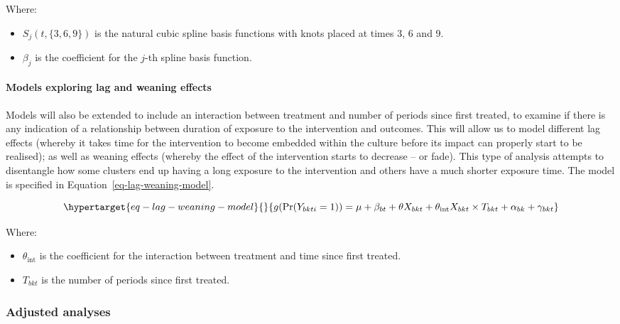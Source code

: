 \documentclass[
]{scrartcl}
\let\oldparagraph\paragraph
\renewcommand{\paragraph}[1]{\oldparagraph{#1}\mbox{}}
\providecommand{\tightlist}{%
  \setlength{\itemsep}{0pt}\setlength{\parskip}{0pt}}\usepackage{longtable,booktabs,array}
\begin{document}
Where:

\begin{itemize}
\tightlist
\item
  \(S_j(t, \{3, 6, 9\})\) is the natural cubic spline basis functions
  with knots placed at times 3, 6 and 9.
\item
  \(\beta_j\) is the coefficient for the \(j\)-th spline basis function.
\end{itemize}

\hypertarget{models-exploring-lag-and-weaning-effects}{%
\paragraph{Models exploring lag and weaning
effects}\label{models-exploring-lag-and-weaning-effects}}

Models will also be extended to include an interaction between treatment
and number of periods since first treated, to examine if there is any
indication of a relationship between duration of exposure to the
intervention and outcomes. This will allow us to model different lag
effects (whereby it takes time for the intervention to become embedded
within the culture before its impact can properly start to be realised);
as well as weaning effects (whereby the effect of the intervention
starts to decrease -- or fade). This type of analysis attempts to
disentangle how some clusters end up having a long exposure to the
intervention and others have a much shorter exposure time. The model is
specified in Equation~\ref{eq-lag-weaning-model}.

\begin{equation}\protect\hypertarget{eq-lag-weaning-model}{}{
g(\text{Pr}(Y_{bkti} = 1)) = \mu + \beta_{bt} + \theta X_{bkt} + \theta_{\text{int}} X_{bkt} \times T_{bkt} + \alpha_{bk} + \gamma_{bkt}
}\label{eq-lag-weaning-model}\end{equation}

Where:

\begin{itemize}
\tightlist
\item
  \(\theta_{\text{int}}\) is the coefficient for the interaction between
  treatment and time since first treated.
\item
  \(T_{bkt}\) is the number of periods since first treated.
\end{itemize}

\hypertarget{adjusted-analyses}{%
\subsubsection{Adjusted analyses}\label{adjusted-analyses}}
\end{document}
